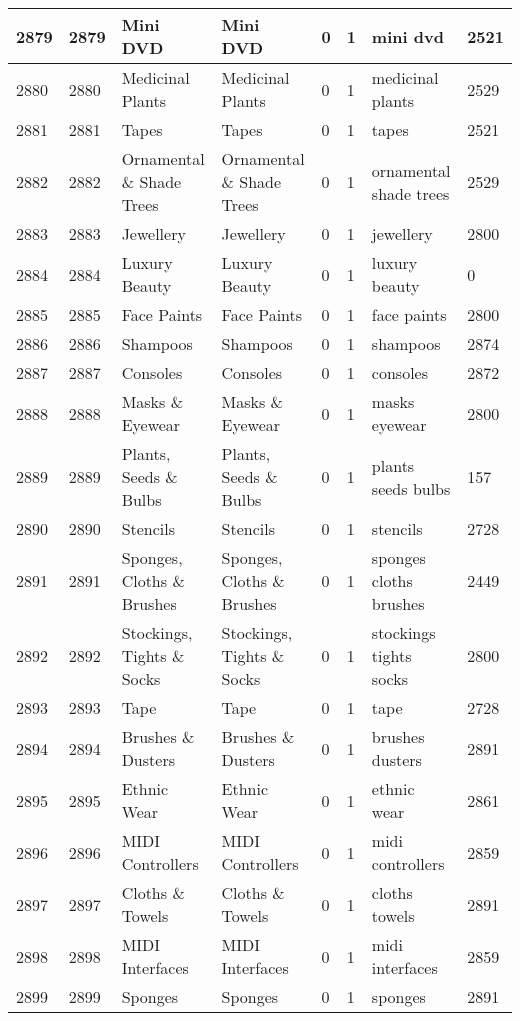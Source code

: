 \begin{longtable}{|l|l|l|l|l|l|l|l|}
2879 & 2879 & Mini DVD & Mini DVD & 0 & 1 & mini dvd & 2521 \\ \hline 
2880 & 2880 & Medicinal Plants & Medicinal Plants & 0 & 1 & medicinal plants & 2529 \\ \hline 
2881 & 2881 & Tapes & Tapes & 0 & 1 & tapes & 2521 \\ \hline 
2882 & 2882 & Ornamental \& Shade Trees & Ornamental \& Shade Trees & 0 & 1 & ornamental shade trees & 2529 \\ \hline 
2883 & 2883 & Jewellery & Jewellery & 0 & 1 & jewellery & 2800 \\ \hline 
2884 & 2884 & Luxury Beauty & Luxury Beauty & 0 & 1 & luxury beauty & 0 \\ \hline 
2885 & 2885 & Face Paints & Face Paints & 0 & 1 & face paints & 2800 \\ \hline 
2886 & 2886 & Shampoos & Shampoos & 0 & 1 & shampoos & 2874 \\ \hline 
2887 & 2887 & Consoles & Consoles & 0 & 1 & consoles & 2872 \\ \hline 
2888 & 2888 & Masks \& Eyewear & Masks \& Eyewear & 0 & 1 & masks eyewear & 2800 \\ \hline 
2889 & 2889 & Plants, Seeds \& Bulbs & Plants, Seeds \& Bulbs & 0 & 1 & plants seeds bulbs & 157 \\ \hline 
2890 & 2890 & Stencils & Stencils & 0 & 1 & stencils & 2728 \\ \hline 
2891 & 2891 & Sponges, Cloths \& Brushes & Sponges, Cloths \& Brushes & 0 & 1 & sponges cloths brushes & 2449 \\ \hline 
2892 & 2892 & Stockings, Tights \& Socks & Stockings, Tights \& Socks & 0 & 1 & stockings tights socks & 2800 \\ \hline 
2893 & 2893 & Tape & Tape & 0 & 1 & tape & 2728 \\ \hline 
2894 & 2894 & Brushes \& Dusters & Brushes \& Dusters & 0 & 1 & brushes dusters & 2891 \\ \hline 
2895 & 2895 & Ethnic Wear & Ethnic Wear & 0 & 1 & ethnic wear & 2861 \\ \hline 
2896 & 2896 & MIDI Controllers & MIDI Controllers & 0 & 1 & midi controllers & 2859 \\ \hline 
2897 & 2897 & Cloths \& Towels & Cloths \& Towels & 0 & 1 & cloths towels & 2891 \\ \hline 
2898 & 2898 & MIDI Interfaces & MIDI Interfaces & 0 & 1 & midi interfaces & 2859 \\ \hline 
2899 & 2899 & Sponges & Sponges & 0 & 1 & sponges & 2891 \\ \hline 

\end{longtable}
